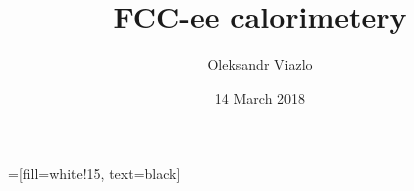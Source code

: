 \documentclass[8pt]{beamer}
\newif\ifplacelogo %
\begin{document}
\newcommand{\backupbegin}{
   \newcounter{finalframe}
   \setcounter{finalframe}{\value{framenumber}}
}
\newcommand{\backupend}{
   \setcounter{framenumber}{\value{finalframe}}
}

\newcommand{\myNode}{\tikz[baseline,inner sep=1pt] \node[anchor=base]}

 =[fill=white!15, text=black]



\title[ Pandora PFA FCC-ee \hspace{19.5em}\insertframenumber/
\inserttotalframenumber]{FCC-ee calorimetery }


	\author[Oleksandr Viazlo]{Oleksandr Viazlo\\ 
	}
	
       
	\date{14 March 2018}


	

   	

\placelogofalse
\end{document}

